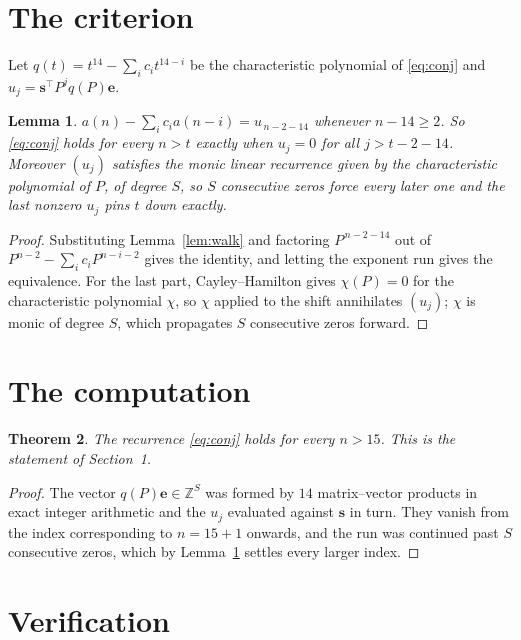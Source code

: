 \documentclass[11pt,a4paper]{article}
\theoremstyle{plain}
\newtheorem{theorem}{Theorem}
\newtheorem{lemma}[theorem]{Lemma}
\theoremstyle{definition}
\begin{document}
\section{The criterion}

Let $q(t)=t^{14}-\sum_i c_i t^{14-i}$ be the characteristic polynomial of
\eqref{eq:conj} and $u_j=\mathbf{s}^{\!\top}P^{j}q(P)\mathbf{e}$.

\begin{lemma}\label{lem:crit}
$a(n)-\sum_i c_i a(n-i)=u_{\,n-2-14}$ whenever $n-14\ge2$. So \eqref{eq:conj}
holds for every $n>t$ exactly when $u_j=0$ for all $j>t-2-14$. Moreover $(u_j)$
satisfies the monic linear recurrence given by the characteristic polynomial of $P$, of
degree $S$, so $S$ consecutive zeros force every later one and the last nonzero $u_j$ pins
$t$ down exactly.
\end{lemma}

\begin{proof}
Substituting Lemma~\ref{lem:walk} and factoring $P^{\,n-2-14}$ out of
$P^{n-2}-\sum_i c_i P^{n-i-2}$ gives the identity, and letting the exponent run gives the
equivalence. For the last part, Cayley--Hamilton gives $\chi(P)=0$ for the characteristic
polynomial $\chi$, so $\chi$ applied to the shift annihilates $(u_j)$; $\chi$ is monic of
degree $S$, which propagates $S$ consecutive zeros forward.
\end{proof}

\section{The computation}

\begin{theorem}
The recurrence \eqref{eq:conj} holds for every $n>15$. This is the statement of
Section~1.
\end{theorem}

\begin{proof}
The vector $q(P)\mathbf{e}\in\mathbb{Z}^{S}$ was formed by $14$ matrix--vector
products in exact integer arithmetic and the $u_j$ evaluated against $\mathbf{s}$ in turn.
They vanish from the index corresponding to $n=15+1$ onwards, and the run was continued
past $S$ consecutive zeros, which by Lemma~\ref{lem:crit} settles every larger index.
\end{proof}

\section{Verification}
\end{document}
